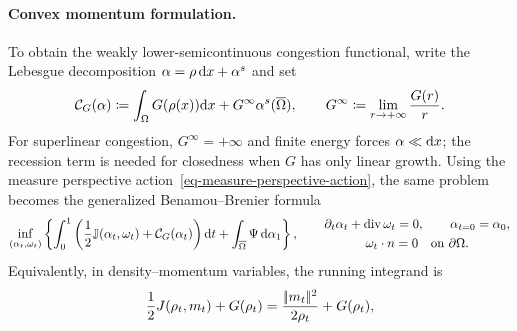 \paragraph{Convex momentum formulation.}
To obtain the weakly lower-semicontinuous congestion functional, write the Lebesgue decomposition $\alpha=\rho\,\mathrm{d} x+\alpha^s$ and set
\begin{equation}\label{eq-mfg-congestion-functional}
\mathcal C_G(\alpha)
\coloneqq
\int_\Omega G(\rho(x))\mathrm{d} x
+G^\infty\alpha^s(\overline\Omega),
\qquad
G^\infty\coloneqq\lim_{r\to+\infty}\frac{G(r)}r.
\end{equation}
For superlinear congestion, $G^\infty=+\infty$ and finite energy forces $\alpha\ll\mathrm{d} x$; the recession term is needed for closedness when $G$ has only linear growth. Using the measure perspective action~\eqref{eq-measure-perspective-action}, the same problem becomes the generalized Benamou--Brenier formula
\begin{equation}\label{eq-variational-mfg-momentum}
\inf_{(\alpha_t,\omega_t)}
\left\{
\int_0^1
\left(
\frac12\mathbb J(\alpha_t,\omega_t)
+\mathcal C_G(\alpha_t)
\right)\mathrm{d} t
+\int_{\overline\Omega}\Psi\,\mathrm{d}\alpha_1
\right\},
\qquad
\begin{gathered}
\partial_t\alpha_t+\operatorname{div}\omega_t=0,
\qquad \alpha_{t=0}=\alpha_0,\\
\omega_t\cdot n=0\quad\text{on }\partial\Omega.
\end{gathered}
\end{equation}
Equivalently, in density--momentum variables, the running integrand is
\begin{equation}\label{eq-variational-mfg-density-momentum}
\frac12J(\rho_t,m_t)+G(\rho_t)
=
\frac{|\!| m_t |\!|^2}{2\rho_t}+G(\rho_t),
\end{equation}
